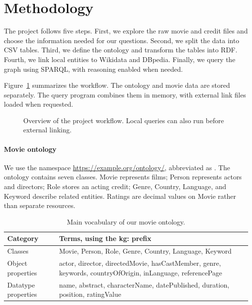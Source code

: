 \section{Methodology}\label{sec:method}
The project follows five steps. First, we explore the raw movie and credit files and choose the information needed for our questions. Second, we split the data into CSV tables. Third, we define the ontology and transform the tables into RDF. Fourth, we link local entities to Wikidata and DBpedia. Finally, we query the graph using SPARQL, with reasoning enabled when needed.

Figure~\ref{fig:pipeline} summarizes the workflow. The ontology and movie data are stored separately. The query program combines them in memory, with external link files loaded when requested.

\begin{figure}[t]
\centering
{}
\caption{Overview of the project workflow. Local queries can also run before external linking.}
\label{fig:pipeline}
\end{figure}

\paragraph{Movie ontology}
We use the namespace \url{https://example.org/ontology/}, abbreviated as . The ontology contains seven classes. Movie represents films; Person represents actors and directors; Role stores an acting credit; Genre, Country, Language, and Keyword describe related entities. Ratings are decimal values on Movie rather than separate resources.

\begin{table}[t]
\caption{Main vocabulary of our movie ontology.}
\centering\small
\begin{tabularx}{\columnwidth}{@{}lX@{}}
\toprule Category & Terms, using the kg: prefix\\\midrule
Classes & Movie, Person, Role, Genre, Country, Language, Keyword\\
Object properties & actor, director, directedMovie, hasCastMember, genre, keywords, countryOfOrigin, inLanguage, referencePage\\
Datatype properties & name, abstract, characterName, datePublished, duration, position, ratingValue\\
\bottomrule\end{tabularx}
\end{table}

